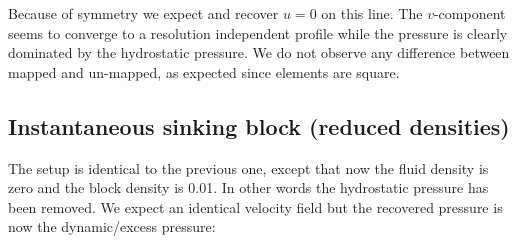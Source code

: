 Because of symmetry we expect and recover $u=0$ on this line.
The $v$-component seems to converge to a resolution independent profile
while the pressure is clearly dominated by the hydrostatic pressure.
We do not observe any difference between mapped and un-mapped, as expected
since elements are square.

\newpage
\subsection*{Instantaneous sinking block (reduced densities)}

The setup is identical to the previous one, except that now the fluid density is zero and 
the block density is 0.01. In other words the hydrostatic pressure has been removed.
We expect an identical velocity field but the recovered pressure is now the 
dynamic/excess pressure:

